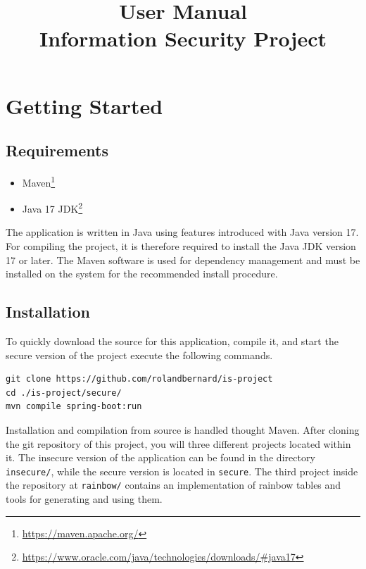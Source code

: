 \documentclass[conference,onecolumn,a4paper]{IEEEtran}
\begin{document}
\title{
    \Huge{User Manual} \\
    \large{Information Security Project}
}

\author{
}

\maketitle
\thispagestyle{plain}
\pagestyle{plain}

\section{Getting Started}

\subsection{Requirements}

\begin{itemize}
    \item Maven\footnote{\url{https://maven.apache.org/}}
    \item Java 17 JDK\footnote{\url{https://www.oracle.com/java/technologies/downloads/\#java17}}
\end{itemize}

The application is written in Java using features introduced with Java version 17. For compiling the project, it is therefore required to install the Java JDK version 17 or later. The Maven software is used for dependency management and must be installed on the system for the recommended install procedure.

\subsection{Installation}

To quickly download the source for this application, compile it, and start the secure version of the project execute the following commands.

\begin{verbatim}
git clone https://github.com/rolandbernard/is-project
cd ./is-project/secure/
mvn compile spring-boot:run
\end{verbatim}

Installation and compilation from source is handled thought Maven. After cloning the git repository of this project, you will three different projects located within it. The insecure version of the application can be found in the directory \verb|insecure/|, while the secure version is located in \verb|secure|. The third project inside the repository at \verb|rainbow/| contains an implementation of rainbow tables and tools for generating and using them.
\end{document}
